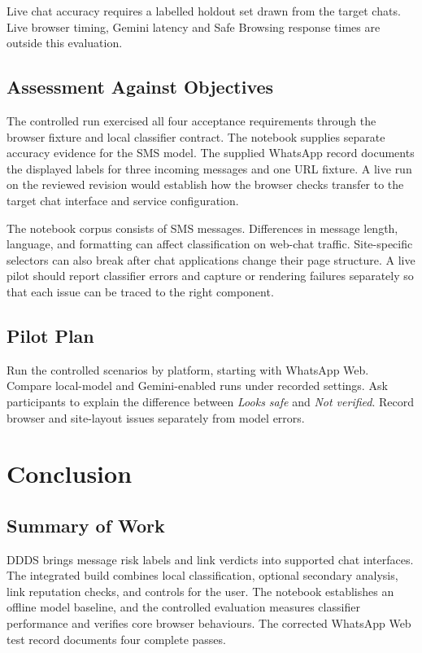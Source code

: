\documentclass[12pt,letterpaper,twoside,openany]{book}
\begin{document}
Live chat accuracy requires a labelled holdout set drawn from the target chats. Live browser timing, Gemini latency and Safe Browsing response times are outside this evaluation.

\section{Assessment Against Objectives}

The controlled run exercised all four acceptance requirements through the browser fixture and local classifier contract. The notebook supplies separate accuracy evidence for the SMS model. The supplied WhatsApp record documents the displayed labels for three incoming messages and one URL fixture. A live run on the reviewed revision would establish how the browser checks transfer to the target chat interface and service configuration.

The notebook corpus consists of SMS messages. Differences in message length, language, and formatting can affect classification on web-chat traffic. Site-specific selectors can also break after chat applications change their page structure. A live pilot should report classifier errors and capture or rendering failures separately so that each issue can be traced to the right component.

\section{Pilot Plan}

Run the controlled scenarios by platform, starting with WhatsApp Web. Compare local-model and Gemini-enabled runs under recorded settings. Ask participants to explain the difference between \textit{Looks safe} and \textit{Not verified}. Record browser and site-layout issues separately from model errors.

\chapter{Conclusion}

\section{Summary of Work}

DDDS brings message risk labels and link verdicts into supported chat interfaces. The integrated build combines local classification, optional secondary analysis, link reputation checks, and controls for the user. The notebook establishes an offline model baseline, and the controlled evaluation measures classifier performance and verifies core browser behaviours. The corrected WhatsApp Web test record documents four complete passes.
\end{document}
